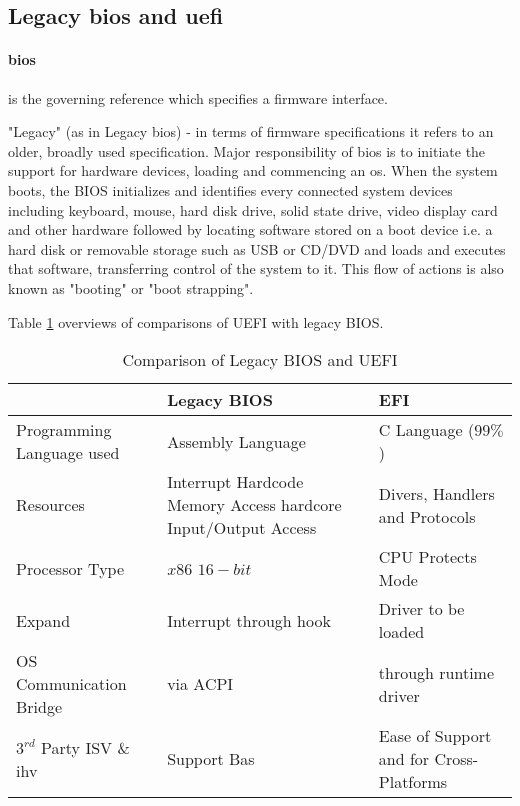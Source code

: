 \subsection{Legacy \gls{bios} and \gls{uefi}}

\paragraph{\gls{bios}} is the governing reference which specifies a firmware interface.

"Legacy" (as in Legacy \gls{bios}) -  in terms of firmware specifications it refers to an older, broadly used specification. Major responsibility of \gls{bios} is to initiate the support for hardware devices, loading and commencing an \gls{os}. When the system boots, the BIOS initializes and identifies every connected system devices including keyboard, mouse, hard disk drive, solid state drive, video display card and other hardware followed by locating software stored on a boot device i.e. a hard disk or removable storage such as USB or CD/DVD and loads and executes that software, transferring control of the system to it. This flow of actions is also known as "booting" or "boot strapping".

Table \ref{table:legacy-bios-vs-uefi} overviews of comparisons of UEFI with legacy BIOS.

\begin{table}
  \centering
  \renewcommand{\arraystretch}{2}
  \caption{Comparison of Legacy BIOS and UEFI}\label{table:legacy-bios-vs-uefi}
  \begin{tabular}{l | p{5cm} | p{5cm}}
    & Legacy BIOS & EFI
    \\ \hline \hline
    Programming Language used & Assembly Language & C Language ($ 99\% $)
    \\ \hline
    Resources & Interrupt Hardcode Memory Access hardcore Input/Output Access & Divers, Handlers and Protocols
    \\ \hline
    Processor Type & $ x86 $ $ 16-bit $ & CPU Protects Mode
    \\ \hline
    Expand & Interrupt through hook & Driver to be loaded
    \\ \hline
    OS Communication Bridge & via ACPI & through runtime driver
    \\ \hline
    $ 3^{rd} $ Party ISV \& \gls{ihv} & Support Bas & Ease of Support and for Cross-Platforms
    \\ \hline
  \end{tabular}
\end{table}

